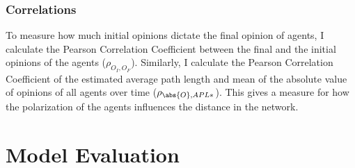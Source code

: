 \documentclass{article}
\DeclarePairedDelimiter{\abs}\lvert\rvert
\begin{document}
\subsubsection{Correlations}
To measure how much initial opinions dictate the final opinion of agents, I calculate the Pearson Correlation Coefficient between the final and the initial opinions of the agents ($\rho_{O_I, O_F}$).
Similarly, I calculate the Pearson Correlation Coefficient of the estimated average path length and mean of the absolute value of opinions of all agents over time ($\rho_{\abs{O}, APL*}$). This gives a measure for how the polarization of the agents influences the distance in the network. 

\section{Model Evaluation}
\end{document}
